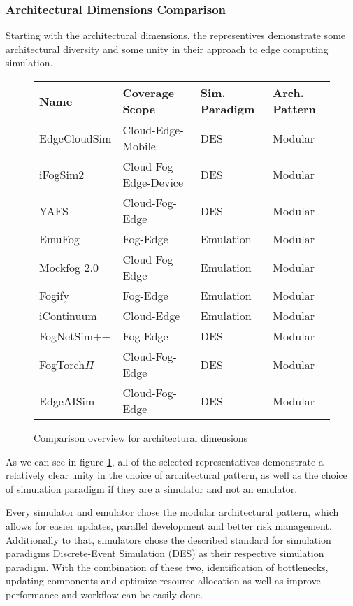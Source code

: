 \subsubsection{Architectural Dimensions Comparison}
Starting with the architectural dimensions, the representives demonstrate some architectural diversity and some unity in their approach to edge computing simulation.

\begin{figure}[H]
  \centering
  \begin{tabularx}{\textwidth}{ l | l | l | l }
    \hline
    \textbf{Name} & \textbf{Coverage Scope} & \textbf{Sim. Paradigm} & \textbf{Arch. Pattern} \\
    \hline\hline
    EdgeCloudSim  & Cloud-Edge-Mobile     & DES       & Modular\\\hline
    iFogSim2      & Cloud-Fog-Edge-Device & DES       & Modular\\\hline
    YAFS          & Cloud-Fog-Edge        & DES       & Modular\\\hline
    EmuFog        & Fog-Edge              & Emulation & Modular\\\hline
    Mockfog 2.0   & Cloud-Fog-Edge        & Emulation & Modular\\\hline
    Fogify        & Fog-Edge              & Emulation & Modular\\\hline
    iContinuum    & Cloud-Edge            & Emulation & Modular\\\hline
    FogNetSim++   & Fog-Edge              & DES       & Modular\\\hline
    FogTorch$\Pi$ & Cloud-Fog-Edge        & DES       & Modular\\\hline
    EdgeAISim     & Cloud-Fog-Edge        & DES       & Modular\\\hline
  \end{tabularx}
  \caption{Comparison overview for architectural dimensions}
  \label{tab:analysis-architectural-dimensions}
\end{figure}

As we can see in figure \ref{tab:analysis-architectural-dimensions}, all of the selected representatives demonstrate a relatively clear unity in the choice of architectural pattern, as well as 
the choice of simulation paradigm if they are a simulator and not an emulator.

Every simulator and emulator chose the modular architectural pattern, which allows for easier updates, parallel development and better risk management.
Additionally to that, simulators chose the described standard for simulation paradigms Discrete-Event Simulation (DES) as their respective simulation paradigm.
With the combination of these two, identification of bottlenecks, updating components and optimize resource allocation as well as improve performance and workflow can be easily done.

